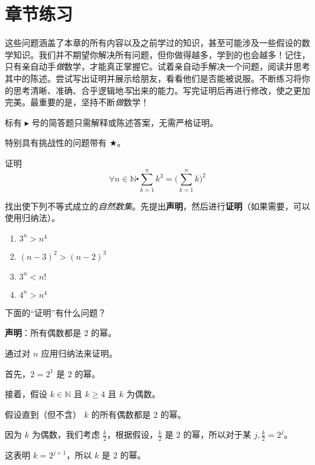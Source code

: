 \section{章节练习} \label{sec:section5.7}

这些问题涵盖了本章的所有内容以及之前学过的知识，甚至可能涉及一些假设的数学知识。我们并不期望你解决所有问题，但你做得越多，学到的也会越多！记住，只有亲自动手\emph{做}数学，才能真正掌握它。试着亲自动手解决一个问题，阅读并思考其中的陈述。尝试写出证明并展示给朋友，看看他们是否能被说服。不断练习将你的思考清晰、准确、合乎逻辑地\emph{写}出来的能力。写完证明后再进行修改，使之更加完美。最重要的是，坚持不断\emph{做}数学！

标有 $\blacktriangleright$ 号的简答题只需解释或陈述答案，无需严格证明。

特别具有挑战性的问题带有 $\bigstar$。

\begin{exercise} \label{exc:exercises5.7.1}
    证明
    \[\forall n \in \mathbb{N} \centerdot \sum_{k=1}^{n} k^3 = \bigg(\sum_{k=1}^{n} k\bigg)^2\]
\end{exercise}

\begin{exercise}
    找出使下列不等式成立的\emph{自然数集}。先提出\textbf{声明}，然后进行\textbf{证明}（如果需要，可以使用归纳法）。
    \begin{enumerate}[label=(\alph*)]
        \item $3^n > n^4$
        \item $(n-3)^2 > (n-2)^3$
        \item $3^n < n!$
        \item $4^n > n^4$
    \end{enumerate}
\end{exercise}

\begin{exercise}
    下面的``证明''有什么问题？

    \textbf{声明}：所有偶数都是 $2$ 的幂。

    \begin{center}
        \noindent
            \parbox{0.85\textwidth}{%
                \linespread{1.5}\selectfont
                通过对 $n$ 应用归纳法来证明。

                首先，$2=2^1$ 是 $2$ 的幂。

                接着，假设 $k \in \mathbb{N}$ 且 $k \ge 4$ 且 $k$ 为偶数。
                
                假设直到（但不含） $k$ 的所有偶数都是 $2$ 的幂。

                因为 $k$ 为偶数，我们考虑 $\frac{k}{2}$，根据假设，$\frac{k}{2}$ 是 $2$ 的幂，所以对于某 $j, \frac{k}{2}=2^j$。

                这表明 $k = 2^{j+1}$，所以 $k$ 是 $2$ 的幂。 
            }
    \end{center}
\end{exercise}

